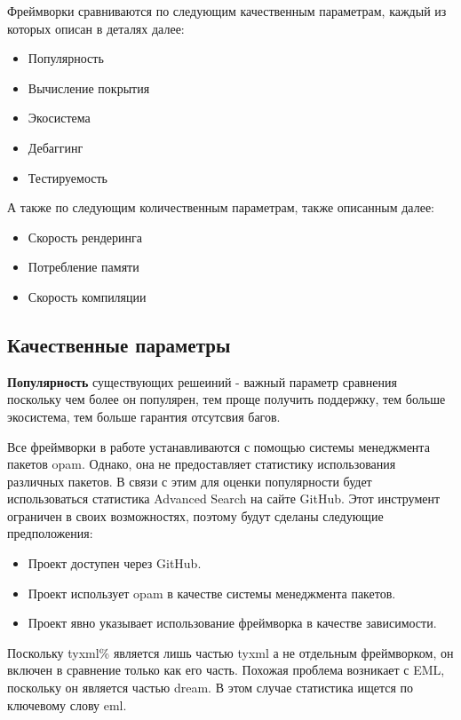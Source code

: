 Фреймворки сравниваются по следующим качественным параметрам, каждый из которых описан в деталях далее:
\begin{itemize}
    \item Популярность
    \item Вычисление покрытия
    \item Экосистема
    \item Дебаггинг
    \item Тестируемость
\end{itemize}

А также по следующим количественным параметрам, также описанным далее:

\begin{itemize}
    \item Скорость рендеринга
    \item Потребление памяти
    \item Скорость компиляции
\end{itemize}

\subsection{Качественные параметры}

\textbf{Популярность} существующих решеиний - важный параметр сравнения поскольку чем более он популярен, тем проще получить поддержку, тем больше экосистема, тем больше гарантия отсутсвия багов.

Все фреймворки в работе устанавливаются с помощью системы менеджмента пакетов opam.
Однако, она не предоставляет статистику использования различных пакетов.
В связи с этим для оценки популярности будет использоваться статистика Advanced Search на сайте GitHub.
Этот инструмент ограничен в своих возможностях, поэтому будут сделаны следующие предположения:
\begin{itemize}
    \item Проект доступен через GitHub.
    \item Проект использует opam в качестве системы менеджмента пакетов.
    \item Проект явно указывает использование фреймворка в качестве зависимости.
\end{itemize}

Поскольку tyxml\% является лишь частью tyxml а не отдельным фреймворком, он включен в сравнение только как его часть.
Похожая проблема возникает с EML, поскольку он является частью dream.
В этом случае статистика ищется по ключевому слову eml.

